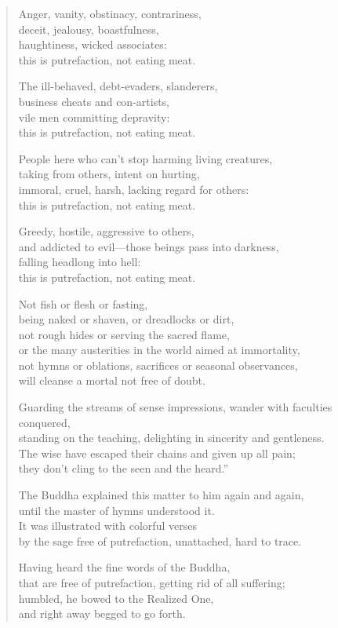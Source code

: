 \documentclass[12pt,openany]{book}%
\begin{document}
\begin{verse}
Anger, vanity, obstinacy, contrariness, \\
deceit, jealousy, boastfulness, \\
haughtiness, wicked associates: \\
this is putrefaction, not eating meat. 

The ill-behaved, debt-evaders, slanderers, \\
business cheats and con-artists, \\
vile men committing depravity: \\
this is putrefaction, not eating meat. 

People here who can’t stop harming living creatures, \\
taking from others, intent on hurting, \\
immoral, cruel, harsh, lacking regard for others: \\
this is putrefaction, not eating meat. 

Greedy, hostile, aggressive to others, \\
and addicted to evil—those beings pass into darkness, \\
falling headlong into hell: \\
this is putrefaction, not eating meat. 

Not fish or flesh or fasting, \\
being naked or shaven, or dreadlocks or dirt, \\
not rough hides or serving the sacred flame, \\
or the many austerities in the world aimed at immortality, \\
not hymns or oblations, sacrifices or seasonal observances, \\
will cleanse a mortal not free of doubt. 

Guarding the streams of sense impressions, wander with faculties conquered, \\
standing on the teaching, delighting in sincerity and gentleness. \\
The wise have escaped their chains and given up all pain; \\
they don’t cling to the seen and the heard.” 

The Buddha explained this matter to him again and again, \\
until the master of hymns understood it. \\
It was illustrated with colorful verses \\
by the sage free of putrefaction, unattached, hard to trace. 

Having heard the fine words of the Buddha, \\
that are free of putrefaction, getting rid of all suffering; \\
humbled, he bowed to the Realized One, \\
and right away begged to go forth. 

%
\end{verse}
\end{document}
